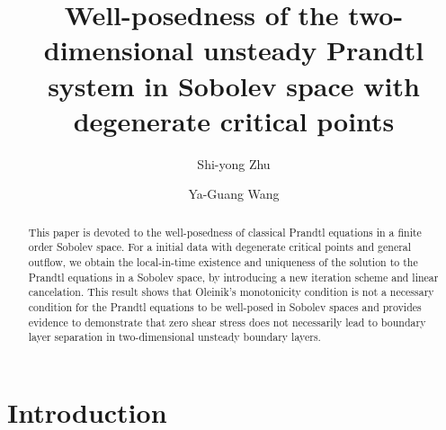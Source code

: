 \documentclass{amsart}
\numberwithin{equation}{section}
\begin{document}
\title[Well-posedness of Prandtl system with degenerate critical points]
{Well-posedness of the two-dimensional unsteady Prandtl system in Sobolev space with degenerate critical points}


\author{Shi-yong Zhu}
\address{Shi-yong Zhu}
\address{College of Mathematics and Systems Science, Shandong University of Science and Technology, Shandong, 266590, P. R. China.}

\author{Ya-Guang Wang}
\address{Ya-Guang Wang
	\newline\indent
	School of Mathematical Sciences, MOE-LSC and SHL-MAC, Shanghai Jiao Tong University,
	Shanghai, P. R. China}



\date{}






\begin{abstract}
This paper is devoted to the well-posedness of classical Prandtl equations in a finite order Sobolev space. For a initial data with degenerate critical points and general outflow, we obtain the local-in-time existence and uniqueness of the solution to the Prandtl equations in a Sobolev space, by introducing a new iteration scheme and linear cancelation. This result shows that Oleinik's monotonicity condition is not a necessary condition for the Prandtl equations to be well-posed in Sobolev spaces and provides evidence to demonstrate that zero shear stress does not necessarily lead to boundary layer separation in two-dimensional unsteady boundary layers.
\end{abstract}

\maketitle

\tableofcontents

\section{Introduction}\setcounter{section}{1}\setcounter{equation}{0}
\end{document}
